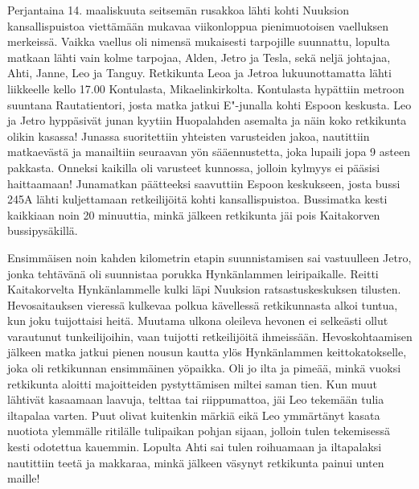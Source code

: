 \begin{multicols}{2}

\noindent Perjantaina 14. maaliskuuta seitsemän rusakkoa lähti kohti Nuuksion
kansallispuistoa viettämään mukavaa viikonloppua pienimuotoisen vaelluksen
merkeissä. Vaikka vaellus oli nimensä mukaisesti tarpojille suunnattu, lopulta
matkaan lähti vain kolme tarpojaa, Alden, Jetro ja Tesla, sekä neljä johtajaa,
Ahti, Janne, Leo ja Tanguy. Retkikunta Leoa ja Jetroa lukuunottamatta lähti
liikkeelle kello 17.00 Kontulasta, Mikaelinkirkolta. Kontulasta hypättiin
metroon suuntana Rautatientori, josta matka jatkui E"-junalla kohti Espoon
keskusta. Leo ja Jetro hyppäsivät junan kyytiin Huopalahden asemalta ja näin
koko retkikunta olikin kasassa! Junassa suoritettiin yhteisten varusteiden
jakoa, nautittiin matkaevästä ja manailtiin seuraavan yön sääennustetta, joka
lupaili jopa 9 asteen pakkasta. Onneksi kaikilla oli varusteet kunnossa,
jolloin kylmyys ei pääsisi haittaamaan! Junamatkan päätteeksi saavuttiin Espoon
keskukseen, josta bussi 245A lähti kuljettamaan retkeilijöitä kohti
kansallispuistoa. Bussimatka kesti kaikkiaan noin 20 minuuttia, minkä jälkeen
retkikunta jäi pois Kaitakorven bussipysäkillä. 

Ensimmäisen noin kahden kilometrin etapin suunnistamisen sai vastuulleen Jetro,
jonka tehtävänä oli suunnistaa porukka Hynkänlammen leiripaikalle. Reitti
Kaitakorvelta Hynkänlammelle kulki läpi Nuuksion ratsastuskeskuksen tilusten.
Hevosaitauksen vieressä kulkevaa polkua kävellessä retkikunnasta alkoi tuntua,
kun joku tuijottaisi heitä. Muutama ulkona oleileva hevonen ei selkeästi ollut
varautunut tunkeilijoihin, vaan tuijotti retkeilijöitä ihmeissään.
Hevoskohtaamisen jälkeen matka jatkui pienen nousun kautta ylös Hynkänlammen
keittokatokselle, joka oli retkikunnan ensimmäinen yöpaikka. Oli jo ilta ja
pimeää, minkä vuoksi retkikunta aloitti majoitteiden pystyttämisen miltei saman
tien. Kun muut lähtivät kasaamaan laavuja, telttaa tai riippumattoa, jäi Leo
tekemään tulia iltapalaa varten. Puut olivat kuitenkin märkiä eikä Leo
ymmärtänyt kasata nuotiota ylemmälle ritilälle tulipaikan pohjan sijaan,
jolloin tulen tekemisessä kesti odotettua kauemmin. Lopulta Ahti sai tulen
roihuamaan ja iltapalaksi nautittiin teetä ja makkaraa, minkä jälkeen väsynyt
retkikunta painui unten maille!


\end{multicols}
